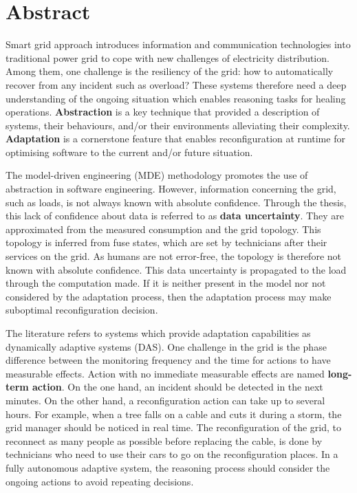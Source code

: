 \chapter*{Abstract}

\bigskip

Smart grid approach introduces information and communication technologies into traditional power grid to cope with new challenges of electricity distribution.
Among them, one challenge is the resiliency of the grid: how to automatically recover from any incident such as overload?
These systems therefore need a deep understanding of the ongoing situation which enables reasoning tasks for healing operations.
\textbf{Abstraction} is a key technique that provided a description of systems, their behaviours, and/or their environments alleviating their complexity.
\textbf{Adaptation} is a cornerstone feature that enables reconfiguration at runtime for optimising software to the current and/or future situation.


The model-driven engineering (MDE) methodology promotes the use of abstraction in software engineering.
However, information concerning the grid, such as loads, is not always known with absolute confidence.
Through the thesis, this lack of confidence about data is referred to as \textbf{data uncertainty}.
They are approximated from the measured consumption and the grid topology.
This topology is inferred from fuse states, which are set by technicians after their services on the grid.
As humans are not error-free, the topology is therefore not known with absolute confidence.
This data uncertainty is propagated to the load through the computation made.
If it is neither present in the model nor not considered by the adaptation process, then the adaptation process may make suboptimal reconfiguration decision.

The literature refers to systems which provide adaptation capabilities as dynamically adaptive systems (DAS).
One challenge in the grid is the phase difference between the monitoring frequency and the time for actions to have measurable effects.
Action with no immediate measurable effects are named \textbf{long-term action}.
On the one hand, an incident should be detected in the next minutes.
On the other hand, a reconfiguration action can take up to several hours.
For example, when a tree falls on a cable and cuts it during a storm, the grid manager should be noticed in real time.
The reconfiguration of the grid, to reconnect as many people as possible before replacing the cable, is done by technicians who need to use their cars to go on the reconfiguration places.
In a fully autonomous adaptive system, the reasoning process should consider the ongoing actions to avoid repeating decisions.

